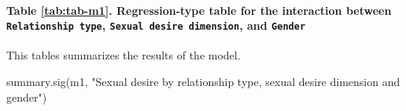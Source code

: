 \documentclass[
  bookmarksnumbered]{article}
\newenvironment{Shaded}{\begin{snugshade}}{\end{snugshade}}
\newcommand{\FunctionTok}[1]{\textcolor[rgb]{0.94,0.94,0.56}{#1}}
\newcommand{\NormalTok}[1]{\textcolor[rgb]{0.80,0.80,0.80}{#1}}
\newcommand{\StringTok}[1]{\textcolor[rgb]{0.80,0.58,0.58}{#1}}
\begin{document}
\hypertarget{table-reftabtab-m1.-regression-type-table-for-the-interaction-between-relationship-type-sexual-desire-dimension-and-gender}{%
\paragraph{\texorpdfstring{Table \ref{tab:tab-m1}. Regression-type table for the interaction between \texttt{Relationship\ type}, \texttt{Sexual\ desire\ dimension}, and \texttt{Gender}}{Table \ref{tab:tab-m1}. Regression-type table for the interaction between Relationship type, Sexual desire dimension, and Gender}}\label{table-reftabtab-m1.-regression-type-table-for-the-interaction-between-relationship-type-sexual-desire-dimension-and-gender}}

This tables summarizes the results of the model.

\begin{Shaded}
\begin{Highlighting}[]
\FunctionTok{summary.sig}\NormalTok{(m1, }\StringTok{"Sexual desire by relationship type, sexual desire dimension and gender"}\NormalTok{)}
\end{Highlighting}
\end{Shaded}
\end{document}
